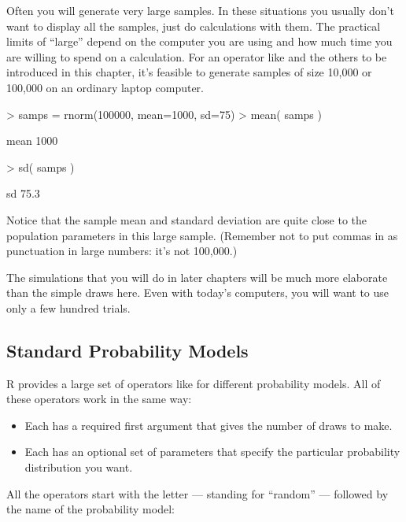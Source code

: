 Often you will generate very large samples.  In these situations you
usually don't want to display all the samples, just do calculations
with them.  The practical limits of ``large'' depend on the computer
you are using and how much time you are willing to spend on a
calculation.   For an operator like  and the others to be
introduced in this chapter, it's feasible to generate samples of size
10,000 or 100,000 on an ordinary laptop computer.  
\begin{Schunk}
\begin{Sinput}
> samps = rnorm(100000, mean=1000, sd=75)
> mean( samps )
\end{Sinput}
\begin{Soutput}
mean 
1000 
\end{Soutput}
\begin{Sinput}
> sd( samps )
\end{Sinput}
\begin{Soutput}
  sd 
75.3 
\end{Soutput}
\end{Schunk}
Notice that the sample mean and standard deviation are quite close to
the population parameters in this large sample.  (Remember not to put commas in as punctuation in large numbers: it's  not 100,000.)

The simulations that you will do in later chapters
will be much more elaborate than the simple draws here.  Even with 
today's computers, you will want to use only a few hundred trials.

\subsection{Standard Probability Models}

R provides a large set of operators like  for different
probability models.  All of these operators work in the same way:
\begin{itemize}
\item Each has a required first argument that gives the number of
draws to make.

\item Each has an optional set of parameters that specify the
particular probability distribution you want.
\end{itemize}

All the operators start with the letter  --- standing for
``random'' --- followed by the name of the probability model:

